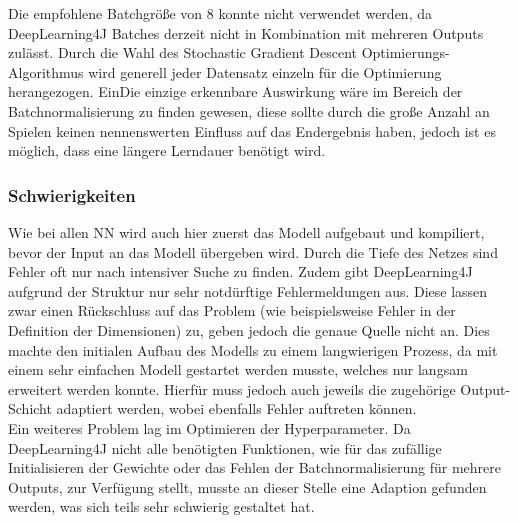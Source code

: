 \documentclass[12pt,a4paper]{article}
\begin{document}
Die empfohlene Batchgröße von 8 konnte nicht verwendet werden, da DeepLearning4J Batches derzeit nicht in Kombination mit mehreren Outputs zulässt. Durch die Wahl des Stochastic Gradient Descent Optimierungs-Algorithmus wird generell jeder Datensatz einzeln für die Optimierung herangezogen. EinDie einzige erkennbare Auswirkung wäre im Bereich der Batchnormalisierung zu finden gewesen, diese sollte durch die große Anzahl an Spielen keinen nennenswerten Einfluss auf das Endergebnis haben, jedoch ist es möglich, dass eine längere Lerndauer benötigt wird. 

\subsubsection{Schwierigkeiten}
Wie bei allen NN wird auch hier zuerst das Modell aufgebaut und kompiliert, bevor der Input an das Modell übergeben wird. Durch die Tiefe des Netzes sind Fehler oft nur nach intensiver Suche zu finden. Zudem gibt DeepLearning4J aufgrund der Struktur nur sehr notdürftige Fehlermeldungen aus. Diese lassen zwar einen Rückschluss auf das Problem (wie beispielsweise Fehler in der Definition der Dimensionen) zu, geben jedoch die genaue Quelle nicht an. Dies machte den initialen Aufbau des Modells zu einem langwierigen Prozess, da mit einem sehr einfachen Modell gestartet werden musste, welches nur langsam erweitert werden konnte. Hierfür muss jedoch auch jeweils die zugehörige Output-Schicht adaptiert werden, wobei ebenfalls Fehler auftreten können.\\
Ein weiteres Problem lag im Optimieren der Hyperparameter. Da DeepLearning4J nicht alle benötigten Funktionen, wie für das zufällige Initialisieren der Gewichte oder das Fehlen der Batchnormalisierung für mehrere Outputs, zur Verfügung stellt, musste an dieser Stelle eine Adaption gefunden werden, was sich teils sehr schwierig gestaltet hat. 


\newpage

\end{document}
